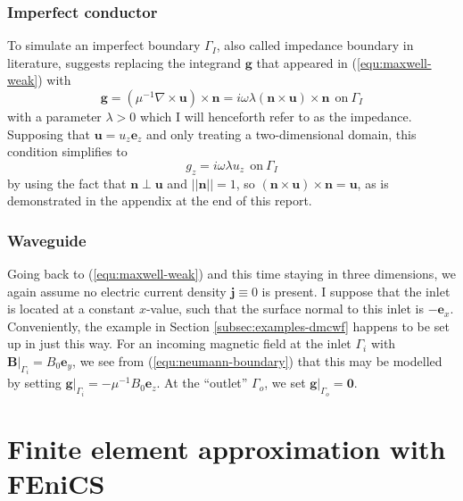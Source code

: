 \documentclass[11pt, a4paper]{article}
\begin{document}
\subsubsection{Imperfect conductor}
\label{subsubsec:impedance}

To simulate an imperfect boundary $\Gamma_I$, also called impedance boundary in literature, 
\cite{monk} suggests replacing the integrand $\mathbf{g}$ that appeared in 
(\ref{equ:maxwell-weak}) with
\begin{equation}
    \mathbf{g} = (\mu^{-1} \nabla \times \mathbf{u}) \times \mathbf{n}
    = i \omega \lambda (\mathbf{n} \times \mathbf{u}) \times \mathbf{n}~~\text{on}~\Gamma_I
    \label{equ:impedance-boundary-g}
\end{equation}
with a parameter $\lambda>0$ which I will henceforth refer to as the impedance.
Supposing that $\mathbf{u} = u_z \mathbf{e}_z$ and only treating a
two-dimensional domain, this condition simplifies to
\begin{equation}
    g_z = i \omega \lambda u_z~~\text{on}~\Gamma_I
\end{equation}
by using the fact that $\mathbf{n} \perp \mathbf{u}$
and $||\mathbf{n}|| = 1$, so $(\mathbf{n} \times \mathbf{u}) \times \mathbf{n} = \mathbf{u}$,
as is demonstrated in the appendix at the end of this report.

\subsubsection{Waveguide}
\label{subsubsec:waveguide}

Going back to (\ref{equ:maxwell-weak}) and this time staying in three dimensions,
we again assume no electric current density $\mathbf{j} \equiv 0$ is present.
I suppose that the inlet is located at a constant $x$-value,
such that the surface normal to this inlet is $-\mathbf{e}_x$. Conveniently, the example 
in Section \ref{subsec:examples-dmcwf} happens to be set up in just this way. For an incoming
magnetic field at the inlet $\Gamma_i$ with $\left.\mathbf{B}\right|_{\Gamma_i} = B_0 \mathbf{e}_y$,
we see from (\ref{equ:neumann-boundary}) that this may be modelled by setting
$\left.\mathbf{g}\right|_{\Gamma_i} = - \mu^{-1} B_0 \mathbf{e}_z$.
At the \enquote{outlet} $\Gamma_o$, we set $\left.\mathbf{g}\right|_{\Gamma_o} = \boldsymbol{0}$.

\newpage
\section{Finite element approximation with FEniCS}
\label{sec:fem}
\end{document}
